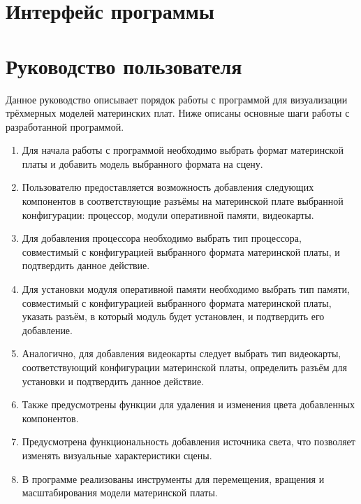 \section{Интерфейс программы}
\FloatBarrier

\section{Руководство пользователя}
Данное руководство описывает порядок работы с программой для визуализации трёхмерных моделей материнских плат. Ниже описаны основные шаги работы с разработанной программой.

\begin{enumerate}
	\item Для начала работы с программой необходимо выбрать формат материнской платы и добавить модель выбранного формата на сцену.
	\item Пользователю предоставляется возможность добавления следующих компонентов в соответствующие разъёмы на материнской плате выбранной конфигурации: процессор, модули оперативной памяти, видеокарты.
	\item Для добавления процессора необходимо выбрать тип процессора, совместимый с конфигурацией выбранного формата материнской платы, и подтвердить данное действие.
	\item Для установки модуля оперативной памяти необходимо выбрать тип памяти, совместимый с конфигурацией выбранного формата материнской платы, указать разъём, в который модуль будет установлен, и подтвердить его добавление.
	\item Аналогично, для добавления видеокарты следует выбрать тип видеокарты, соответствующий конфигурации материнской платы, определить разъём для установки и подтвердить данное действие.
	\item Также предусмотрены функции для удаления и изменения цвета добавленных компонентов.
	\item Предусмотрена функциональность добавления источника света, что позволяет изменять визуальные характеристики сцены.
	\item В программе реализованы инструменты для перемещения, вращения и масштабирования модели материнской платы.
\end{enumerate}



